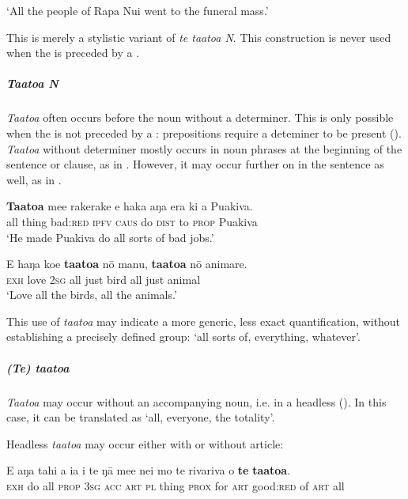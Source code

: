 \glt
‘All the people of Rapa Nui went to the funeral mass.’ \textstyleExampleref{[R231.349]}  
\z

This is merely a stylistic variant of \textit{te ta{\ꞌ}ato{\ꞌ}a N}. This construction is never used when the  is preceded by a .

\subparagraph{\textit{Ta{\ꞌ}ato{\ꞌ}a N}} \textit{Ta{\ꞌ}ato{\ꞌ}a} often occurs before the noun without a determiner. This is only possible when the  is not preceded by a : prepositions require a deteminer to be present (). \textit{Ta{\ꞌ}ato{\ꞌ}a} without determiner mostly occurs in noun phrases at the beginning of the sentence or clause, as in . However, it may occur further on in the sentence as well, as in .

\ea\label{ex:4.54}
\gll \textbf{Ta{\ꞌ}ato{\ꞌ}a} me{\ꞌ}e rakerake e haka aŋa era ki a Puakiva. \\
all thing bad:\textsc{red} \textsc{ipfv} \textsc{caus} do \textsc{dist} to \textsc{prop} Puakiva \\

\glt 
‘He made Puakiva do all sorts of bad jobs.’ \textstyleExampleref{[R229.397]} 
\z

\ea\label{ex:4.55}
\gll E haŋa koe \textbf{ta{\ꞌ}ato{\ꞌ}a} nō manu, \textbf{ta{\ꞌ}ato{\ꞌ}a} nō {\ꞌ}animare. \\
\textsc{exh} love \textsc{2sg} all just bird all just animal \\

\glt
‘Love all the birds, all the animals.’ \textstyleExampleref{[R213.026]} 
\z

This use of \textit{ta{\ꞌ}ato{\ꞌ}a} may indicate a more generic, less exact quantification, without establishing a precisely defined group: ‘all sorts of, everything, whatever’.

\subparagraph{\textit{(Te) ta{\ꞌ}ato{\ꞌ}a}} \textit{Ta{\ꞌ}ato{\ꞌ}a} may occur without an accompanying noun, i.e. in a headless  (). In this case, it can be translated as ‘all, everyone, the totality’. 

Headless \textit{ta{\ꞌ}ato{\ꞌ}a} may occur either with or without article:

\ea\label{ex:4.56}
\gll E aŋa tahi a ia i te ŋā me{\ꞌ}e nei mo te rivariva o \textbf{te} \textbf{ta{\ꞌ}ato{\ꞌ}a}. \\
\textsc{exh} do all \textsc{prop} \textsc{3sg} \textsc{acc} \textsc{art} \textsc{pl} thing \textsc{prox} for \textsc{art} good:\textsc{red} of \textsc{art} all \\

